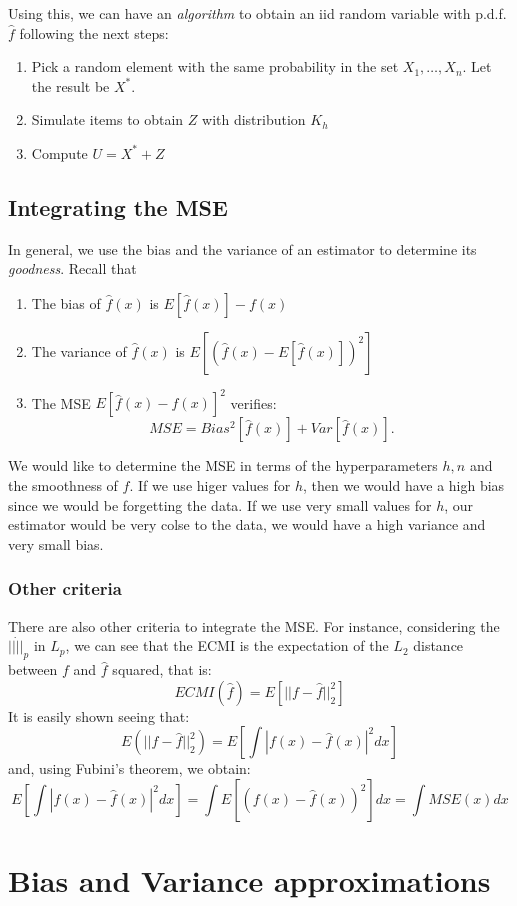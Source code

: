 Using this, we can have an \emph{algorithm} to obtain an iid random variable with p.d.f. $\hat f$ following the next steps:
\begin{enumerate}
\item Pick a random element with the same probability in the set $X_1,\dots,X_n$. Let the result be $X^*$.
\item Simulate items to obtain $Z$ with distribution $K_h$
\item Compute $U = X^* +Z$
\end{enumerate}


\subsection{ Integrating the MSE }

In general, we use the bias and the variance of an estimator to determine its \emph{goodness}. Recall that
\begin{enumerate}
\item The bias of $\hat f (x)$ is $E[\hat f (x)] - f(x)$
\item The variance of $\hat f(x)$ is $E[(\hat f(x) - E[\hat f (x)])^2]$
\item The MSE $E[\hat f(x) - f(x)]^2$ verifies:
\[
MSE = Bias^2[\hat f(x)] + Var[\hat f(x)].
\]
\end{enumerate}

We would like to determine the MSE in terms of the hyperparameters $h,n$ and the smoothness of $f$. If we use higer values for $h$, then we would have a high bias since we would be forgetting the data. If we use very small values for $h$, our estimator would be very colse to the data, we would have a high variance and very small bias. 

\subsubsection{ Other criteria}

There are also other criteria to integrate the MSE. For instance, considering the $||\dot||_p$ in $L_p$, we can see that the ECMI is the expectation of the $L_2$ distance between $f$ and $\hat f$ squared, that is:
\[
ECMI(\hat f) = E[||f-\hat f||_2^2]
\]
It is easily shown seeing that:
\[
E(||f-\hat f||^2_2) = E[ \int |f(x) - \hat f(x)|^2 dx]
\]
and, using Fubini's theorem, we obtain:
\[
E[ \int |f(x) - \hat f(x)|^2 dx] = \int E[(f(x) - \hat f(x))^2] dx = \int MSE(x) dx
\]

\section{ Bias and Variance approximations}

